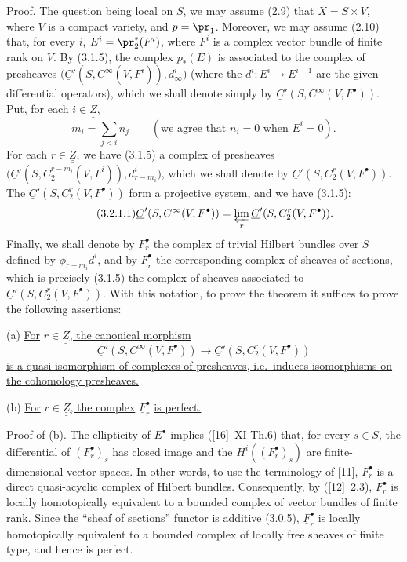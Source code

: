 \uline{Proof.} The question being local on $S$, we may assume (2.9) that $X=S\times V$, where $V$ is a compact variety, and $p=\pr_1$. Moreover, we may assume (2.10) that, for every $i$, $E^i=\pr_2^*(F^i)$, where $F^i$ is a complex vector bundle of finite rank on $V$. By (3.1.5), the complex $p_*(E)$ is associated to the complex of presheaves $\bigl(\underline C'(S,C^\infty(V,F^i)),d_\infty^i\bigr)$ (where the $d^i:E^i\longrightarrow E^{i+1}$ are the given differential operators), which we shall denote simply by $\underline C'(S,C^\infty(V,F^\bullet))$. Put, for each $i\in\underline{\underline{Z}}$,
\[
  m_i=\sum_{j<i} n_j
  \qquad (\text{we agree that } n_i=0 \text{ when } E^i=0).
\]
For each $r\in\underline{\underline{Z}}$, we have (3.1.5) a complex of presheaves $\bigl(\underline C'(S,C_2^{r-m_i}(V,F^i)),d_{r-m_i}^i\bigr)$, which we shall denote by $\underline C'(S,C_2^r(V,F^\bullet))$.
The $\underline C'(S,C_2^r(V,F^\bullet))$ form a projective system, and we have (3.1.5):
\begin{equation}\tag{3.2.1.1}
  \underline C'(S,C^\infty(V,F^\bullet))=\varprojlim_r \underline C'(S,C_2^r(V,F^\bullet)).
\end{equation}
Finally, we shall denote by $F_r^\bullet$ the complex of trivial Hilbert bundles over $S$ defined by $\phi_{r-m_i}d^i$, and by $\underline F_r^\bullet$ the corresponding complex of sheaves of sections, which is precisely (3.1.5) the complex of sheaves associated to $\underline C'(S,C_2^r(V,F^\bullet))$. With this notation, to prove the theorem it suffices to prove the following assertions:

(a) \uline{For} $r\in\underline{\underline{Z}}$\uline{, the canonical morphism}
%
\[
  \underline C'(S,C^\infty(V,F^\bullet))
  \longrightarrow \underline C'(S,C_2^r(V,F^\bullet))
\]
\uline{is a
quasi-isomorphism of complexes of presheaves, i.e.\ induces isomorphisms on the cohomology presheaves.}

(b) \uline{For} $r\in\underline{\underline{Z}}$\uline{, the complex} $\underline F_r^\bullet$ \uline{is perfect.}

\uline{Proof of} (b). The ellipticity of $E^\bullet$ implies ([16]~XI Th.6) that, for every $s\in S$, the differential of $(F_r^\bullet)_s$ has closed image and the $H^i((F_r^\bullet)_s)$ are finite-dimensional vector spaces. In other words, to use the terminology of [11], $F_r^\bullet$ is a direct quasi-acyclic complex of Hilbert bundles. Consequently, by ([12]~2.3), $F_r^\bullet$ is locally homotopically equivalent to a bounded complex of vector bundles of finite rank. Since the \textquotedblleft sheaf of sections\textquotedblright{} functor is additive (3.0.5), $\underline F_r^\bullet$ is locally homotopically equivalent to a bounded complex of locally free sheaves of finite type, and hence is perfect.

